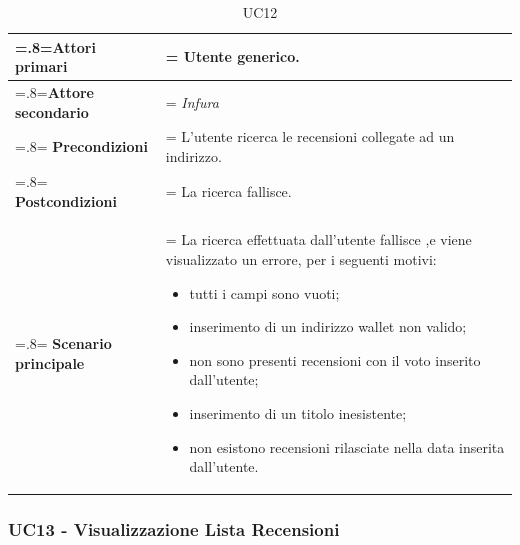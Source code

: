             \begin{table}[H]
                \centering
                \renewcommand{\arraystretch}{1.8}
                \renewcommand\tabularxcolumn[1]{m{#1}}
                \begin{tabularx}{0.9\textwidth} {
                    >{\hsize=.8\hsize\linewidth=\hsize}X
                    >{\hsize=1.2\hsize\linewidth=\hsize}X}
                    \hline
                    \textbf{Attori primari} & Utente generico. \\
                    \hline
                    \textbf{Attore secondario} & \textit{Infura} \\
                    \hline
                    \textbf{Precondizioni} & L'utente ricerca le recensioni collegate ad un indirizzo. \\
                    \hline
                    \textbf{Postcondizioni} & La ricerca fallisce. \\
                    \hline
                    \textbf{Scenario principale} & La ricerca effettuata dall'utente fallisce ,e viene visualizzato un errore, per i seguenti motivi:
                    \begin{itemize}
                        \item tutti i campi sono vuoti;
                        \item inserimento di un indirizzo wallet non valido;
                        \item non sono presenti recensioni con il voto inserito dall'utente;
                        \item inserimento di un titolo inesistente;
                        \item non esistono recensioni rilasciate nella data inserita dall'utente.
                    \end{itemize} \\
                    \hline
                \end{tabularx}
                \caption{UC12}
            \end{table}

        \subsubsection{UC13 - Visualizzazione Lista Recensioni}
        \label{UC13}

